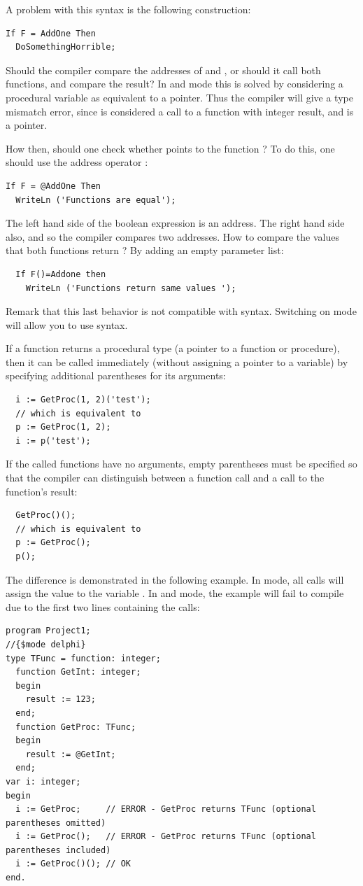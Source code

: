 A problem with this syntax is the following construction:
\begin{verbatim}
If F = AddOne Then
  DoSomethingHorrible;
\end{verbatim}
Should the compiler compare the addresses of  and ,
or should it call both functions, and compare the result? In  and
 mode this is solved by considering a procedural variable as
equivalent to a pointer. Thus the compiler will give a type mismatch error,
since  is considered a call to a function with integer result,
and  is a pointer.

How then, should one check whether  points to the function
? To do this, one should use the address operator :
\begin{verbatim}
If F = @AddOne Then
  WriteLn ('Functions are equal');
\end{verbatim}
The left hand side of the boolean expression is an address. The right hand
side also, and so the compiler compares two addresses.
How to compare the values that both functions return ? By adding an empty
parameter list:
\begin{verbatim}
  If F()=Addone then
    WriteLn ('Functions return same values ');
\end{verbatim}
Remark that this last behavior is not compatible with \delphi syntax.
Switching on  mode will allow you to use \delphi syntax.

If a function returns a procedural type (a pointer to a function or procedure),
then it can be called immediately (without assigning a pointer to a variable)
by specifying additional parentheses for its arguments:
\begin{verbatim}
  i := GetProc(1, 2)('test');
  // which is equivalent to
  p := GetProc(1, 2);
  i := p('test');
\end{verbatim}
If the called functions have no arguments, empty parentheses must be specified
so that the compiler can distinguish between a function call and a call to the
function's result:
\begin{verbatim}
  GetProc()();
  // which is equivalent to
  p := GetProc();
  p();
\end{verbatim}
The difference is demonstrated in the following example. In  mode,
all calls will assign the value  to the variable . In 
and  mode, the example will fail to compile due to the first two
lines containing the calls:
\begin{verbatim}
program Project1;
//{$mode delphi}
type TFunc = function: integer;
  function GetInt: integer;
  begin
    result := 123;
  end;
  function GetProc: TFunc;
  begin
    result := @GetInt;
  end;
var i: integer;
begin
  i := GetProc;     // ERROR - GetProc returns TFunc (optional parentheses omitted)
  i := GetProc();   // ERROR - GetProc returns TFunc (optional parentheses included)
  i := GetProc()(); // OK
end.
\end{verbatim}

